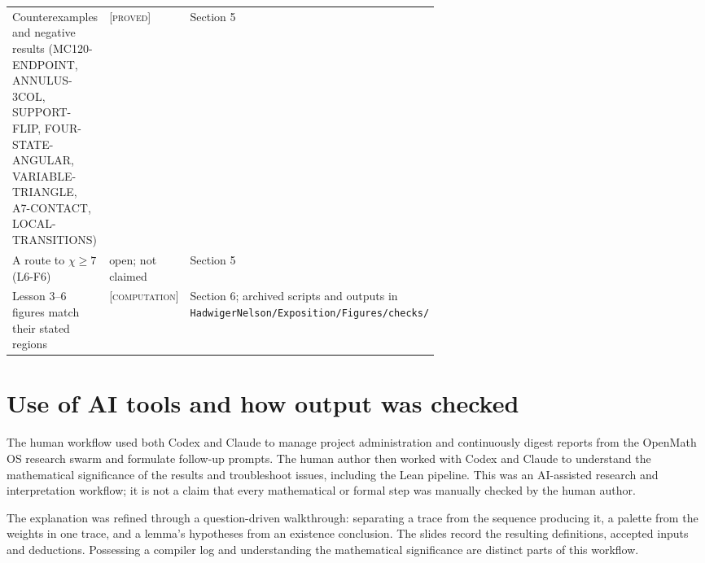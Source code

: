 \documentclass[11pt]{article}
\theoremstyle{definition}
\theoremstyle{remark}
\newcommand{\st}[1]{\textsc{[#1]}}
\begin{document}
\begin{center}
\begin{tabularx}{\linewidth}{@{}P{0.41\linewidth}P{0.20\linewidth}X@{}}
Counterexamples and negative results (MC120-ENDPOINT, ANNULUS-3COL, SUPPORT-FLIP, FOUR-STATE-ANGULAR, VARIABLE-TRIANGLE, A7-CONTACT, LOCAL-TRANSITIONS) & \st{proved} & Section 5\\
A route to $\chi\ge7$ (L6-F6) & open; not claimed & Section 5\\
Lesson 3--6 figures match their stated regions & \st{computation} & Section 6; archived scripts and outputs in \texttt{HadwigerNelson/\allowbreak{}Exposition/\allowbreak{}Figures/\allowbreak{}checks/\allowbreak{}}\\
\bottomrule
\end{tabularx}
\end{center}

\section{Use of AI tools and how output was checked}
The human workflow used both Codex and Claude to manage project administration and continuously digest reports from the OpenMath OS research swarm and formulate follow-up prompts. The human author then worked with Codex and Claude to understand the mathematical significance of the results and troubleshoot issues, including the Lean pipeline. This was an AI-assisted research and interpretation workflow; it is not a claim that every mathematical or formal step was manually checked by the human author.

The explanation was refined through a question-driven walkthrough: separating
a trace from the sequence producing it, a palette from the weights in one
trace, and a lemma's hypotheses from an existence conclusion. The slides
record the resulting definitions, accepted inputs and deductions. Possessing
a compiler log and understanding the mathematical significance are distinct
parts of this workflow.
\end{document}

